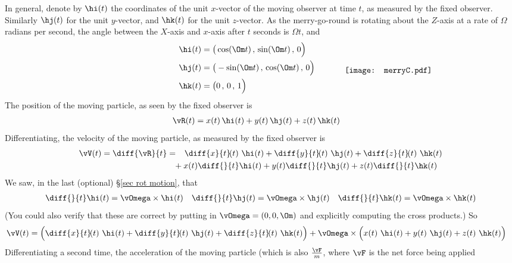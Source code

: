 In general, denote by $\hi(t)$ the coordinates of the unit $x$-vector
of the moving observer at time $t$, as measured by the fixed observer.
Similarly $\hj(t)$ for the unit $y$-vector, and $\hk(t)$ for the unit 
$z$-vector. As the merry-go-round is rotating about the $Z$-axis at a rate of $\Omega$ radians per second, the angle between the $X$-axis
and $x$-axis after $t$ seconds is $\Omega t$, and
\medskip
\begin{align*}
\null\hskip1.5in
\hi(t) &= \big(\cos(\Om t)\,,\,\sin(\Om t)\,,\,0\Big) \\
\hj(t) &= \big(-\sin(\Om t)\,,\,\cos(\Om t)\,,\,0\Big)\hskip0.5in
\smash{\raisebox{-0.45\height}{\texttt{[image: merryC.pdf]}}} \\
\hk(t) &= \big(0\,,\,0\,,\,1\Big) 
\end{align*}
The position of the moving particle, as seen by the fixed observer is
\begin{align*}
\vR(t) &= x(t)\,\hi(t) + y(t)\,\hj(t) +z(t)\,\hk(t)
\end{align*}
Differentiating, the velocity of the moving particle, as measured 
by the fixed observer is
\begin{align*}
\vV(t)=\diff{\vR}{t} &= \phantom{+}\diff{x}{t}\!(t)\ \hi(t) 
                         + \diff{y}{t}\!(t)\ \hj(t) 
                         + \diff{z}{t}\!(t)\ \hk(t) \\
                     &\phantom{=} +x(t)\diff{\hfill}{t} \hi(t)
                                  +y(t)\diff{\hfill}{t} \hj(t)
                                  +z(t)\diff{\hfill}{t} \hk(t)
\end{align*}
We saw, in the last (optional) \S\ref{sec rot motion}, that
\begin{align*}
\diff{\hfill}{t} \hi(t)=\vOmega\times\hi(t)\quad
\diff{\hfill}{t} \hj(t)=\vOmega\times\hj(t)\quad
\diff{\hfill}{t} \hk(t)=\vOmega\times\hk(t)
\end{align*}
(You could also verify that these are correct by putting in
$\vOmega = (0,0,\Om)$ and explicitly computing the cross products.)
So
\begin{align*}
\vV(t)&= \Big(\diff{x}{t}\!(t)\ \hi(t) 
                         + \diff{y}{t}\!(t)\ \hj(t) 
                         + \diff{z}{t}\!(t)\ \hk(t)\Big)
                     +\vOmega\times\Big(x(t)\ \hi(t)
                                  +y(t)\ \hj(t)
                                  +z(t)\ \hk(t)\Big)
\end{align*}
Differentiating a second time, the acceleration of the moving particle
(which is also $\frac{\vF}{m}$, where $\vF$ is the net force being applied
